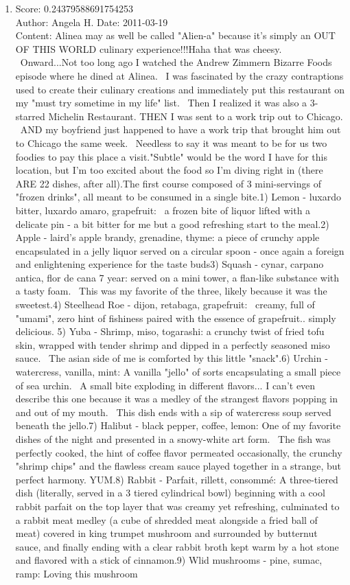 \documentclass[paper=a4, fontsize=11pt]{jhwhw} %
\begin{document}
\begin{itemize}
\begin{enumerate}
            \item Score: 0.24379588691754253\\
                Author: Angela H.
                Date: 2011-03-19\\
                Content: Alinea may as well be called "Alien-a" because it's simply an OUT OF THIS WORLD culinary experience!!!Haha that was cheesy.  Onward...Not too long ago I watched the Andrew Zimmern Bizarre Foods episode where he dined at Alinea.  I was fascinated by the crazy contraptions used to create their culinary creations and immediately put this restaurant on my "must try sometime in my life" list.  Then I realized it was also a 3-starred Michelin Restaurant. THEN I was sent to a work trip out to Chicago.  AND my boyfriend just happened to have a work trip that brought him out to Chicago the same week.  Needless to say it was meant to be for us two foodies to pay this place a visit."Subtle" would be the word I have for this location, but I'm too excited about the food so I'm diving right in (there ARE 22 dishes, after all).The first course composed of 3 mini-servings of "frozen drinks", all meant to be consumed in a single bite.1) Lemon - luxardo bitter, luxardo amaro, grapefruit:  a frozen bite of liquor lifted with a delicate pin - a bit bitter for me but a good refreshing start to the meal.2) Apple - laird's apple brandy, grenadine, thyme: a piece of crunchy apple encapsulated in a jelly liquor served on a circular spoon - once again a foreign and enlightening experience for the taste buds3) Squash - cynar, carpano antica, flor de cana 7 year: served on a mini tower, a flan-like substance with a tasty foam.  This was my favorite of the three, likely because it was the sweetest.4) Steelhead Roe - dijon, retabaga, grapefruit:  creamy, full of "umami", zero hint of fishiness paired with the essence of grapefruit.. simply delicious. 5) Yuba - Shrimp, miso, togarashi: a crunchy twist of fried tofu skin, wrapped with tender shrimp and dipped in a perfectly seasoned miso sauce.  The asian side of me is comforted by this little "snack".6) Urchin - watercress, vanilla, mint: A vanilla "jello" of sorts encapsulating a small piece of sea urchin.  A small bite exploding in different flavors... I can't even describe this one because it was a medley of the strangest flavors popping in and out of my mouth.  This dish ends with a sip of watercress soup served beneath the jello.7) Halibut - black pepper, coffee, lemon: One of my favorite dishes of the night and presented in a snowy-white art form.  The fish was perfectly cooked, the hint of coffee flavor permeated occasionally, the crunchy "shrimp chips" and the flawless cream sauce played together in a strange, but perfect harmony. YUM.8) Rabbit - Parfait, rillett, consommé: A three-tiered dish (literally, served in a 3 tiered cylindrical bowl) beginning with a cool rabbit parfait on the top layer that was creamy yet refreshing, culminated to a rabbit meat medley (a cube of shredded meat alongside a fried ball of meat) covered in king trumpet mushroom and surrounded by butternut sauce, and finally ending with a clear rabbit broth kept warm by a hot stone and flavored with a stick of cinnamon.9) Wlid mushrooms - pine, sumac, ramp: Loving this mushroom 
\end{enumerate}
\end{itemize}
\end{document}
